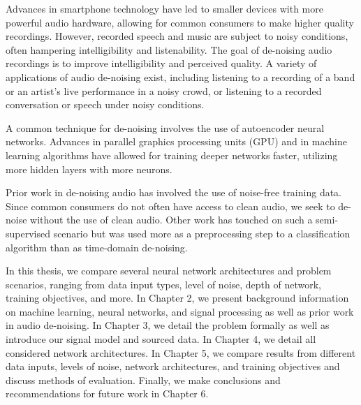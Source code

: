 Advances in smartphone technology have led to smaller devices with more powerful audio hardware, allowing for common consumers to make higher quality recordings. However, recorded speech and music are subject to noisy conditions, often hampering intelligibility and listenability. The goal of de-noising audio recordings is to improve intelligibility and perceived quality. A variety of applications of audio de-noising exist, including listening to a recording of a band or an artist's live performance in a noisy crowd, or listening to a recorded conversation or speech under noisy conditions.

A common technique for de-noising involves the use of autoencoder neural networks. \cite{liu2014experiments} Advances in parallel graphics processing units (GPU) and in machine learning algorithms have allowed for training deeper networks faster, utilizing more hidden layers with more neurons.

Prior work in de-noising audio has involved the use of noise-free training data. Since common consumers do not often have access to clean audio, we seek to de-noise without the use of clean audio. Other work has touched on such a semi-supervised scenario but was used more as a preprocessing step to a classification algorithm than as time-domain de-noising. \cite{stow}

In this thesis, we compare several neural network architectures and problem scenarios, ranging from data input types, level of noise, depth of network, training objectives, and more. In Chapter 2, we present background information on machine learning, neural networks, and signal processing as well as prior work in audio de-noising. In Chapter 3, we detail the problem formally as well as introduce our signal model and sourced data. In Chapter 4, we detail all considered network architectures. In Chapter 5, we compare results from different data inputs, levels of noise, network architectures, and training objectives and discuss methods of evaluation. Finally, we make conclusions and recommendations for future work in Chapter 6.
